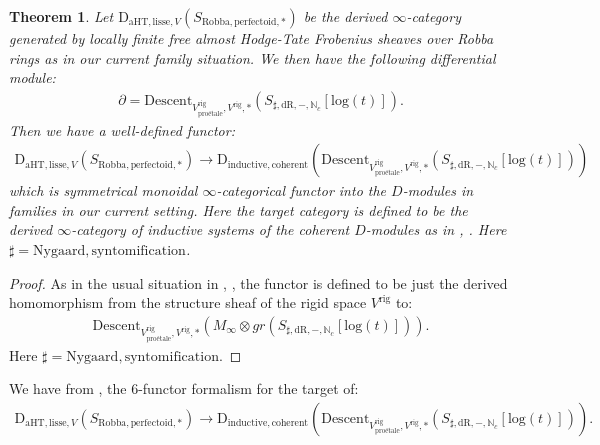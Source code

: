 \documentclass[12pt]{article}
\newtheorem{theorem}{Theorem}
\theoremstyle{definition}
\begin{document}
\begin{theorem}
Let $\mathrm{D}_{\mathrm{aHT},\mathrm{lisse},V}(S_{\mathrm{Robba},\mathrm{perfectoid},*})$ be the derived $\infty$-category generated by locally finite free almost Hodge-Tate Frobenius sheaves over Robba rings as in our current family situation. We then have the following differential module:
\begin{align}
\partial=\mathrm{Descent}_{V^\mathrm{rig}_\text{pro\'etale},V^\mathrm{rig},*}(S_{\sharp,\mathrm{dR},-,\mathbb{N}_c}[\mathrm{log}(t)]).
\end{align}
Then we have a well-defined functor:
\begin{align}
\mathrm{D}_{\mathrm{aHT},\mathrm{lisse},V}(S_{\mathrm{Robba},\mathrm{perfectoid},*})\longrightarrow \mathrm{D}_{\mathrm{inductive},\mathrm{coherent}}(\mathrm{Descent}_{V^\mathrm{rig}_\text{pro\'etale},V^\mathrm{rig},*}(S_{\sharp,\mathrm{dR},-,\mathbb{N}_c}[\mathrm{log}(t)]))
\end{align}
which is symmetrical monoidal $\infty$-categorical functor into the $D$-modules in families in our current setting. Here the target category is defined to be the derived $\infty$-category of inductive systems of the coherent $D$-modules as in \cite{5GR1}, \cite{5GR2}. Here $\sharp=\mathrm{Nygaard},\mathrm{syntomification}$.
\end{theorem}

\begin{proof}
As in the usual situation in \cite{5L}, \cite{5BLA}, \cite{5BLB} the functor is defined to be just the derived homomorphism from the structure sheaf of the rigid space $V^\mathrm{rig}$ to:
\begin{align}
\mathrm{Descent}_{V^\mathrm{rig}_\text{pro\'etale},V^\mathrm{rig},*}(M_\infty\otimes gr(S_{\sharp,\mathrm{dR},-,\mathbb{N}_c}[\mathrm{log}(t)])).
\end{align}
Here $\sharp=\mathrm{Nygaard},\mathrm{syntomification}$.
\end{proof}



We have from \cite{5GR1}, \cite{5GR2} the 6-functor formalism for the target of:
\begin{align}
\mathrm{D}_{\mathrm{aHT},\mathrm{lisse},V}(S_{\mathrm{Robba},\mathrm{perfectoid},*})\longrightarrow \mathrm{D}_{\mathrm{inductive},\mathrm{coherent}}(\mathrm{Descent}_{V^\mathrm{rig}_\text{pro\'etale},V^\mathrm{rig},*}(S_{\sharp,\mathrm{dR},-,\mathbb{N}_c}[\mathrm{log}(t)])).
\end{align}
\end{document}
